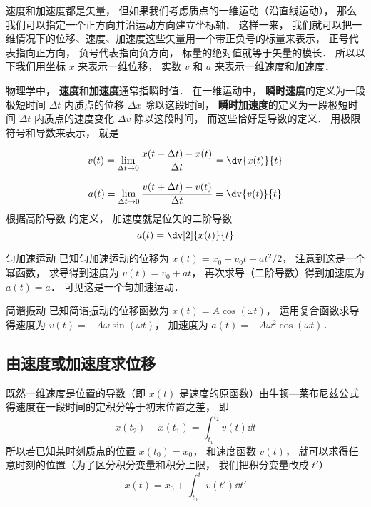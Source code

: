 

速度和加速度都是矢量， 但如果我们考虑质点的一维运动（沿直线运动）， 那么我们可以指定一个正方向并沿运动方向建立坐标轴． 这样一来， 我们就可以把一维情况下的位移、速度、加速度这些矢量用一个带正负号的标量来表示， 正号代表指向正方向， 负号代表指向负方向， 标量的绝对值就等于矢量的模长． 所以以下我们用坐标 $x$ 来表示一维位移， 实数 $v$ 和 $a$ 来表示一维速度和加速度．

物理学中， \textbf{速度}和\textbf{加速度}通常指瞬时值． 在一维运动中， \textbf{瞬时速度}的定义为一段极短时间 $\Delta t$ 内质点的位移 $\Delta x$ 除以这段时间， \textbf{瞬时加速度}的定义为一段极短时间 $\Delta t$ 内质点的速度变化 $\Delta v$ 除以这段时间， 而这些恰好是导数的定义． 用极限符号和导数来表示， 就是

\begin{equation}
v(t) = \lim_{\Delta t\to 0} \frac{x(t+\Delta t) - x(t)}{\Delta t} = \dv{x(t)}{t}
\end{equation}

\begin{equation}
a(t) = \lim_{\Delta t\to 0} \frac{v(t+\Delta t) - v(t)}{\Delta t} = \dv{v(t)}{t}
\end{equation}
根据高阶导数%
的定义， 加速度就是位矢的二阶导数
\begin{equation}
a(t) = \dv[2]{x(t)}{t}
\end{equation}

\begin{example}{匀加速运动}
已知匀加速运动的位移为 $x(t) = x_0 + v_0 t + a t^2/2$， 注意到这是一个幂函数， 求导得到速度为 $v(t) = v_0 + a t$， 再次求导（二阶导数）得到加速度为 $a(t) = a$． 可见这是一个匀加速运动．
\end{example}

\begin{example}{简谐振动}
已知简谐振动的位移函数为 $x(t) = A\cos(\omega t)$， 运用复合函数求导%
得速度为 $v(t) = -A\omega\sin(\omega t)$， 加速度为 $a(t) = -A\omega^2\cos(\omega t)$．
\end{example}


\subsection{由速度或加速度求位移}
既然一维速度是位置的导数（即 $x(t)$ 是速度的原函数）由牛顿—莱布尼兹公式得速度在一段时间的定积分等于初末位置之差， 即
\begin{equation}\label{VnA1_eq4}
x(t_2) - x(t_1) = \int_{t_1}^{t_2} v(t) \dd{t}
\end{equation}
所以若已知某时刻质点的位置 $x(t_0) = x_0$， 和速度函数 $v(t)$， 就可以求得任意时刻的位置（为了区分积分变量和积分上限， 我们把积分变量改成 $t'$）
\begin{equation}\label{VnA1_eq5}
x(t) = x_0 + \int_{t_0}^t v(t') \dd{t'}
\end{equation}

